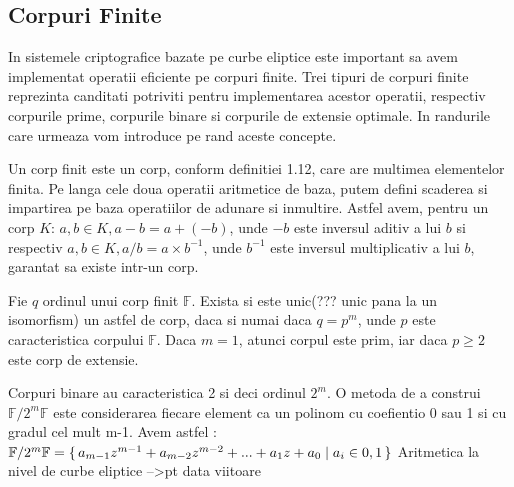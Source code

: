 \subsection{Corpuri Finite}
\label{subsec:subsec01}

In sistemele criptografice bazate pe curbe eliptice este important sa avem implementat operatii eficiente pe corpuri finite. Trei tipuri de corpuri finite reprezinta canditati potriviti pentru implementarea acestor operatii, respectiv corpurile prime, corpurile binare si corpurile de extensie optimale. In randurile care urmeaza vom introduce pe rand aceste concepte.

\begin{dfn}
Un corp finit este un corp, conform definitiei 1.12, care are multimea elementelor finita. Pe langa cele doua operatii aritmetice de baza, putem defini scaderea si impartirea pe baza operatiilor de adunare si inmultire. Astfel avem, pentru un corp $K$: $a, b\in K, a-b = a + (-b)$, unde $-b$ este inversul aditiv a lui $b$ si respectiv $a, b\in K, a/b = a \times b^{-1}$, unde $b^{-1}$ este inversul multiplicativ a lui $b$, garantat sa existe intr-un corp. 
\end{dfn}

\begin{teo}
Fie $q$ ordinul unui corp finit $\mathbb{F}$. Exista si este unic(??? unic pana la un isomorfism) un astfel de corp, daca si numai daca $q=p^{m}$, unde $p$ este caracteristica corpului $\mathbb{F}$. Daca $m=1$, atunci corpul este prim, iar daca $p\geq 2$ este corp de extensie.
\end{teo}

\begin{dfn}
Corpuri binare au caracteristica 2 si deci ordinul $2^{m}$. O metoda de a construi $\mathbb{F}/2^{m}\mathbb{F}$ este considerarea fiecare element ca un polinom cu coefientio 0 sau 1 si cu gradul cel mult m-1. Avem astfel : 
 $\mathbb{F}/2^{m}\mathbb{F} = \set {a_{m-1}z^{m-1} + a_{m-2}z^{m-2} + ... + a_{1}z + a_{0}\mid a_{i}\in {0,1}}$
 Aritmetica la nivel de curbe eliptice -->pt data viitoare
\end{dfn}



